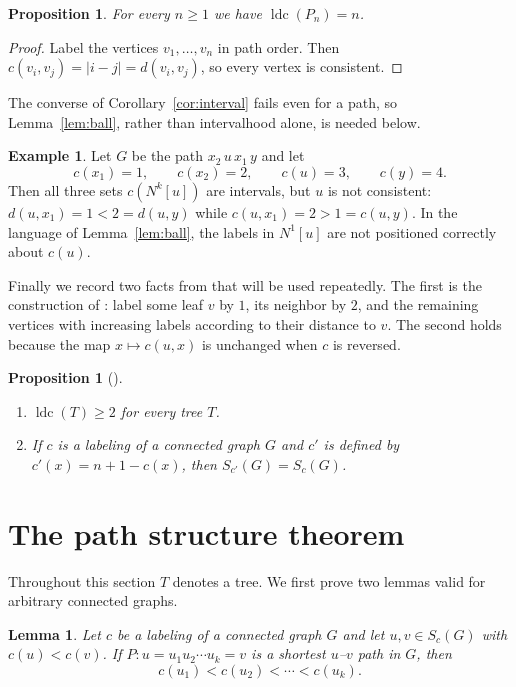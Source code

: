 \documentclass[reqno,10pt]{article}
\newtheorem{lemma}[theorem]{Lemma}
\newtheorem{proposition}[theorem]{Proposition}
\theoremstyle{definition}
\newtheorem{example}[theorem]{Example}
\numberwithin{equation}{section}
\numberwithin{theorem}{section}
\newcommand{\ldc}{\operatorname{ldc}}
\newcommand{\Ball}[2]{N^{#2}[#1]}
\begin{document}
\begin{proposition}
\label{prop:path}
For every $n\ge1$ we have $\ldc(P_n)=n$.
\end{proposition}

\begin{proof}
Label the vertices $v_1,\dots,v_n$ in path order. Then
$c(v_i,v_j)=|i-j|=d(v_i,v_j)$, so every vertex is consistent.
\end{proof}

The converse of Corollary~\ref{cor:interval} fails even for a path, so
Lemma~\ref{lem:ball}, rather than intervalhood alone, is needed below.

\begin{example}
\label{ex:notsufficient}
Let $G$ be the path $x_2\,u\,x_1\,y$ and let
\[
  c(x_1)=1,\qquad c(x_2)=2,\qquad c(u)=3,\qquad c(y)=4 .
\]
Then all three sets $c(\Ball{u}{k})$ are intervals, but $u$ is not consistent:
$d(u,x_1)=1<2=d(u,y)$ while $c(u,x_1)=2>1=c(u,y)$. In the language of
Lemma~\ref{lem:ball}, the labels in $\Ball{u}{1}$ are not positioned correctly
about $c(u)$.
\end{example}

Finally we record two facts from \cite{CH2025} that will be used repeatedly.
The first is the construction of \cite[Section 4]{CH2025}: label some leaf $v$
by $1$, its neighbor by $2$, and the remaining vertices with increasing labels
according to their distance to $v$. The second holds because the map
$x\mapsto c(u,x)$ is unchanged when $c$ is reversed.

\begin{proposition}[\cite{CH2025}]
\label{prop:basic}
\begin{enumerate}
\item[\textup{(i)}] $\ldc(T)\ge2$ for every tree $T$.
\item[\textup{(ii)}] If $c$ is a labeling of a connected graph $G$ and $c'$ is
defined by $c'(x)=n+1-c(x)$, then $S_{c'}(G)=S_c(G)$.
\end{enumerate}
\end{proposition}

\section{The path structure theorem}
\label{sec:path}

Throughout this section $T$ denotes a tree. We first prove two lemmas valid
for arbitrary connected graphs.

\begin{lemma}
\label{lem:monotone}
Let $c$ be a labeling of a connected graph $G$ and let $u,v\in S_c(G)$ with
$c(u)<c(v)$. If $P:u=u_1u_2\cdots u_k=v$ is a shortest $u$--$v$ path in $G$,
then
\[
  c(u_1)<c(u_2)<\cdots<c(u_k).
\]
\end{lemma}
\end{document}
